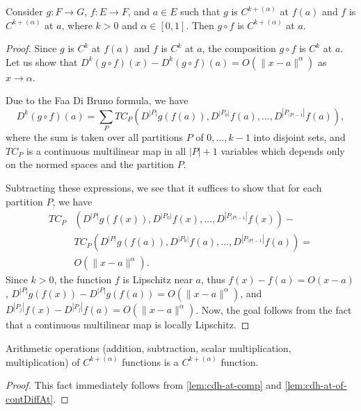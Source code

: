 \begin{lemma}%
  \label{lem:cdh-at-comp}
  Consider \(g\colon F \to G\), \(f\colon E \to F\), and \(a \in E\)
  such that \(g\) is \(C^{k+(\alpha)}\) at \(f(a)\) and \(f\) is \(C^{k+(\alpha)}\) at \(a\), where \(k > 0\) and \(\alpha \in [0, 1]\).
  Then \(g\circ f\) is \(C^{k+(\alpha)}\) at \(a\).
\end{lemma}

\begin{proof}
  Since \(g\) is \(C^{k}\) at \(f(a)\) and \(f\) is \(C^{k}\) at \(a\),
  the composition \(g\circ f\) is \(C^{k}\) at \(a\).
  Let us show that \(D^{k}(g\circ f)(x) - D^{k}(g\circ f)(a) = O(\|x - a\|^{\alpha})\) as \(x\to \alpha\).

  Due to the Faa Di Bruno formula, we have
  \[
    D^k(g\circ f)(a) = \sum_{P}TC_{P}\left(D^{|P|}g(f(a)), D^{|P_{0}|}f(a), \dots, D^{\left|P_{|P|-1}\right|}f(a)\right),
  \]
  where the sum is taken over all partitions \(P\) of \(0, \dots, k - 1\) into disjoint sets,
  and \(TC_{P}\) is a continuous multilinear map in all \(|P|+1\) variables
  which depends only on the normed spaces and the partition \(P\).

  Subtracting these expressions, we see that it suffices to show that for each partition \(P\),
  we have
  \begin{align*}
    TC_{P}&\left(D^{|P|}g(f(x)), D^{|P_{0}|}f(x), \dots, D^{\left|P_{|P|-1}\right|}f(x)\right) -\\
          &TC_{P}\left(D^{|P|}g(f(a)), D^{|P_{0}|}f(a), \dots, D^{\left|P_{|P|-1}\right|}f(a)\right) =\\
          &O(\|x - a\|^{\alpha}).
  \end{align*}
  Since \(k > 0\), the function \(f\) is Lipschitz near \(a\),
  thus \(f(x) - f(a) = O(x - a)\), \(D^{|P|}g(f(x)) - D^{|P|}g(f(a)) = O(\|x - a\|^{\alpha})\), and \(D^{|P_{j}|}f(x) - D^{|P_{j}|}f(a) = O(\|x - a\|^{\alpha})\).
  Now, the goal follows from the fact that a continuous multilinear map is locally Lipschitz.
\end{proof}

\begin{corollary}%
  \label{cor:cdh-at-arith}
  Arithmetic operations (addition, subtraction, scalar multiplication, multiplication)
  of \(C^{k+(\alpha)}\) functions is a \(C^{k+(\alpha)}\) function.
\end{corollary}

\begin{proof}
  This fact immediately follows
  from \autoref{lem:cdh-at-comp} and \autoref{lem:cdh-at-of-contDiffAt}.
\end{proof}


